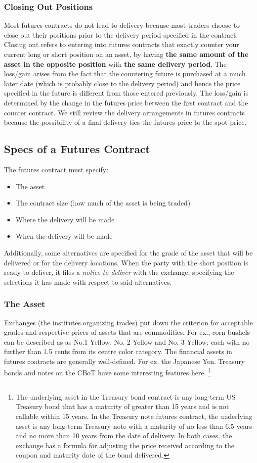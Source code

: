 \documentclass{article}
\begin{document}
\subsubsection*{Closing Out Positions}
Most futures contracts do not lead to delivery because most traders choose to close out their positions
prior to the delivery period specified in the contract. Closing out refers to entering into futures
contracts that exactly counter your current long or short position on an asset, by having \textbf{the same amount
of the asset in the opposite position} with \textbf{the same delivery period}. The loss/gain arises
from the fact that the countering future is purchased at a much later date (which is probably close
to the delivery period) and hence the price specified in the future is different from those entered previously.
The loss/gain is determined by the change in the futures price between the first contract and the counter contract.
We still review the delivery arrangements in futures contracts  because the possibility of a final delivery
ties the futures price to the spot price.
\subsection{Specs of a Futures Contract}
The futures contract must specify:
\begin{itemize}
    \item The asset
    \item The contract size (how much of the asset is being traded)
    \item Where the delivery will be made
    \item When the delivery will be made
\end{itemize}
Additionally, some alternatives are specified for the grade of the asset that will be delivered
or for the delivery locations. When the party with the short position is ready to deliver,
it files a \emph{notice to deliver} with the exchange, specifying the selections it has made
with respect to said alternatives.
\subsubsection*{The Asset}
Exchanges (the institutes organizing trades) put down the criterion for acceptable grades
and respective prices of assets that are commodities. For ex., corn bushels can be described
as as No.1 Yellow, No. 2 Yellow and No. 3 Yellow; each with no further than 1.5 cents from its
centre color category. The financial assets in futures contracts are generally well-defined. For ex.
the Japanese Yen. Treasury bonds and notes on the CBoT have some interesting features here.
\footnote{The underlying asset in the Treasury bond
contract is any long-term US Treasury bond that has a maturity of greater than 15 years and
is not callable within 15 years. In the Treasury note futures contract, the underlying
asset is any long-term Treasury note with a maturity of no less than 6.5 years and no
more than 10 years from the date of delivery. In both cases, the exchange has a formula
for adjusting the price received according to the coupon and maturity date of the bond
delivered.} 
\end{document}
